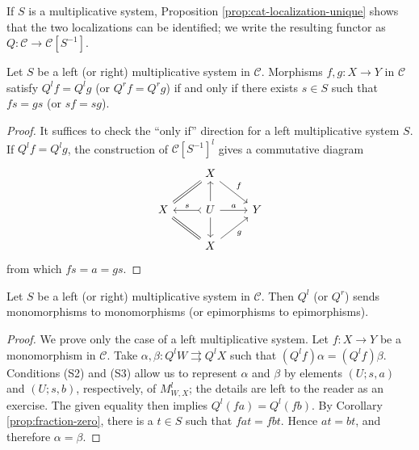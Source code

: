 \begin{convention}
	If $S$ is a multiplicative system, Proposition
	\ref{prop:cat-localization-unique} shows that the two localizations can be
	identified; we write the resulting functor as
	$Q:\mathcal{C}\to\mathcal{C}[S^{-1}]$.
\end{convention}

\begin{corollary}\label{prop:fraction-zero}
	Let $S$ be a left (or right) multiplicative system in $\mathcal{C}$.
	Morphisms $f,g:X\to Y$ in $\mathcal{C}$ satisfy $Q^lf=Q^lg$ (or
	$Q^rf=Q^rg$) if and only if there exists $s\in S$ such that $fs=gs$ (or
	$sf=sg$).
\end{corollary}
\begin{proof}
	It suffices to check the ``only if'' direction for a left multiplicative
	system $S$. If $Q^lf=Q^lg$, the construction of
	$\mathcal{C}[S^{-1}]^l$ gives a commutative diagram
	\[\begin{tikzcd}
		& X \arrow[equal, ld] \arrow[rd, "f"] & \\
		X & U \arrow[rightarrowtail, l, "s"'] \arrow[r, "a"] \arrow[d] \arrow[u] & Y \\
		& X \arrow[equal, lu] \arrow[ru, "g"'] &
	\end{tikzcd}\]
	from which $fs=a=gs$.
\end{proof}

\begin{corollary}\label{prop:fraction-mono-epi}
	Let $S$ be a left (or right) multiplicative system in $\mathcal{C}$. Then
	$Q^l$ (or $Q^r$) sends monomorphisms to monomorphisms (or epimorphisms to
	epimorphisms).
\end{corollary}
\begin{proof}
	We prove only the case of a left multiplicative system. Let $f:X\to Y$ be
	a monomorphism in $\mathcal{C}$. Take
	$\alpha,\beta:Q^lW\rightrightarrows Q^lX$ such that
	$(Q^lf)\alpha=(Q^lf)\beta$. Conditions (S2) and (S3) allow us to represent
	$\alpha$ and $\beta$ by elements $(U;s,a)$ and $(U;s,b)$, respectively,
	of $M^l_{W,X}$; the details are left to the reader as an exercise. The
	given equality then implies $Q^l(fa)=Q^l(fb)$. By Corollary
	\ref{prop:fraction-zero}, there is a $t\in S$ such that $fat=fbt$. Hence
	$at=bt$, and therefore $\alpha=\beta$.
\end{proof}

